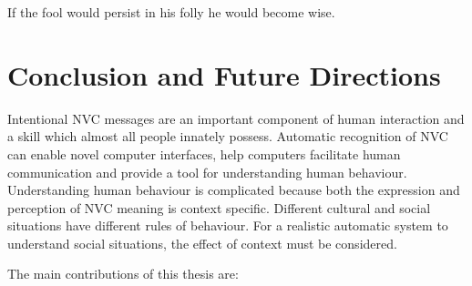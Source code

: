 
\begin{savequote}
If the fool would persist in his folly he would become wise.
\end{savequote}

\chapter[Conclusion and Future Directions]{Conclusion and Future Directions}
\label{ChapterConclusion}

Intentional \acf{NVC} messages are an important component of human interaction and a skill which almost all people innately possess. Automatic recognition of \ac{NVC} can enable novel computer interfaces, help computers facilitate human communication and provide a tool for understanding human behaviour. Understanding human behaviour is complicated because both the expression and perception of \ac{NVC} meaning is context specific. Different cultural and social situations have different rules of behaviour. For a realistic automatic system to understand social situations, the effect of context must be considered.


The main contributions of this thesis are:

